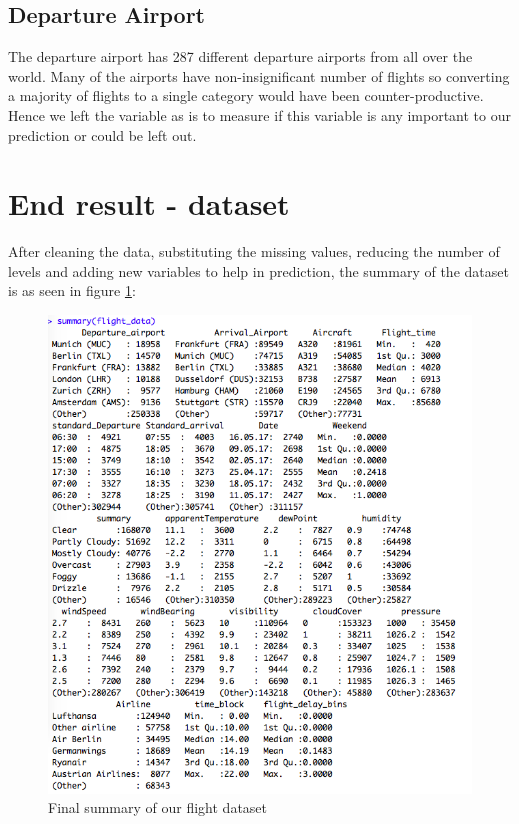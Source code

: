 \subsection{Departure Airport}
The departure airport has 287 different departure airports from all over the world. Many of the airports have non-insignificant number of flights so converting a majority of flights to a single category would have been counter-productive. Hence we left the variable as is to measure if this variable is any important to our prediction or could be left out.

\section{End result - dataset}

After cleaning the data, substituting the missing values, reducing the number of levels and adding new variables to help in prediction, the summary of the dataset is as seen in figure \ref{fig:summary_flights}:

\begin{figure}[ht]
    \centering
    \includegraphics[width=\textwidth]{Figures/summary_flight_data.png}
    \caption{Final summary of our flight dataset}
    \label{fig:summary_flights}
\end{figure}